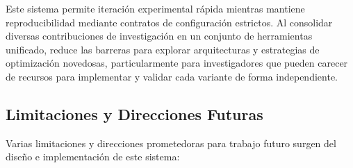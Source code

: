 Este sistema permite iteración experimental rápida mientras mantiene reproducibilidad mediante contratos de configuración estrictos. Al consolidar diversas contribuciones de investigación en un conjunto de herramientas unificado, reduce las barreras para explorar arquitecturas y estrategias de optimización novedosas, particularmente para investigadores que pueden carecer de recursos para implementar y validar cada variante de forma independiente.

\subsection{Limitaciones y Direcciones Futuras}

Varias limitaciones y direcciones prometedoras para trabajo futuro surgen del diseño e implementación de este sistema:

